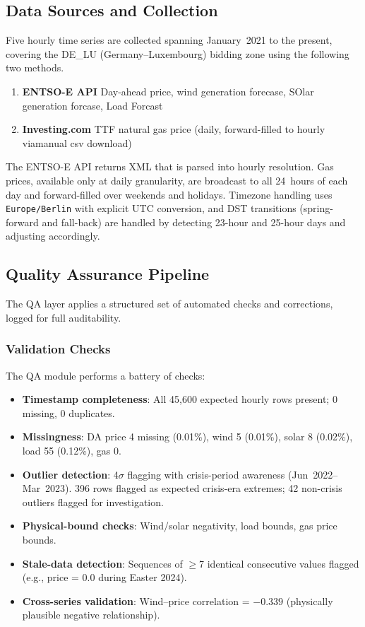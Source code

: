 \documentclass[11pt,a4paper]{article}
\begin{document}
\subsection{Data Sources and Collection}

Five hourly time series are collected spanning January~2021 to the present, covering the DE\_LU (Germany--Luxembourg) bidding zone using the following two methods.

\begin{enumerate}[noitemsep]
\item \textbf{ENTSO-E API} Day-ahead price, wind generation forecase, SOlar generation forcase, Load Forcast
  \item \textbf{Investing.com } TTF natural gas price (daily, forward-filled to hourly viamanual csv download)
\end{enumerate}

The ENTSO-E API returns XML that is parsed into hourly resolution. Gas prices, available only at daily granularity, are broadcast to all 24~hours of each day and forward-filled over weekends and holidays. Timezone handling uses \texttt{Europe/Berlin} with explicit UTC conversion, and DST transitions (spring-forward and fall-back) are handled by detecting 23-hour and 25-hour days and adjusting accordingly.

\subsection{Quality Assurance Pipeline}

The QA layer applies a structured set of automated checks and corrections, logged for full auditability.

\subsubsection{Validation Checks}
The QA module performs a battery of checks:
\begin{itemize}[noitemsep]
  \item \textbf{Timestamp completeness}: All 45{,}600 expected hourly rows present; 0 missing, 0 duplicates.
  \item \textbf{Missingness}: DA price 4 missing (0.01\%), wind 5 (0.01\%), solar 8 (0.02\%), load 55 (0.12\%), gas 0. 
  \item \textbf{Outlier detection}: 4$\sigma$ flagging with crisis-period awareness (Jun~2022--Mar~2023). 396 rows flagged as expected crisis-era extremes; 42 non-crisis outliers flagged for investigation.
  \item \textbf{Physical-bound checks}: Wind/solar negativity, load bounds, gas price bounds.
  \item \textbf{Stale-data detection}: Sequences of $\geq$7 identical consecutive values flagged (e.g., price = 0.0 during Easter 2024).
  \item \textbf{Cross-series validation}: Wind--price correlation = $-0.339$ (physically plausible negative relationship).
\end{itemize}
\end{document}
